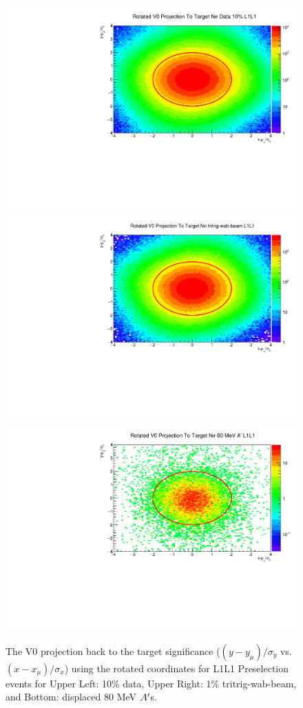 \begin{figure}[t]
    \centering
    \includegraphics[width=.45\textwidth]{figs/selection/10per_v0proj_L1L1.pdf}
    \includegraphics[width=.45\textwidth]{figs/selection/tritrig-wab-beam_L1L1_V0cut.pdf}
    \includegraphics[width=.45\textwidth]{figs/selection/ap-beam_80MeV_L1L1_V0cut.pdf}
    \caption{The V0 projection back to the target significance ($(y-y_{\mu})/\sigma_y$ vs. $(x-x_{\mu})/\sigma_x$) using the rotated coordinates for L1L1 Preselection events for Upper Left: 10\% data, Upper Right: 1\% tritrig-wab-beam, and Bottom: displaced 80 MeV $A^\prime$s. %
    }
    \label{fig:targ_proj_cut}
\end{figure}

